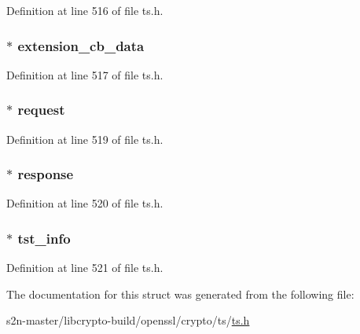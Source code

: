 Definition at line 516 of file ts.\+h.

\subsubsection[{\texorpdfstring{extension\+\_\+cb\+\_\+data}{extension_cb_data}}]{ $\ast$ extension\+\_\+cb\+\_\+data}\hypertarget{struct_t_s__resp__ctx_afc2776f230b919cdbe0ed5a44b3c2958}{}\label{struct_t_s__resp__ctx_afc2776f230b919cdbe0ed5a44b3c2958}


Definition at line 517 of file ts.\+h.

\subsubsection[{\texorpdfstring{request}{request}}]{ $\ast$ request}\hypertarget{struct_t_s__resp__ctx_aa57e1ef1a454401b93515475ff275610}{}\label{struct_t_s__resp__ctx_aa57e1ef1a454401b93515475ff275610}


Definition at line 519 of file ts.\+h.

\subsubsection[{\texorpdfstring{response}{response}}]{ $\ast$ response}\hypertarget{struct_t_s__resp__ctx_ad968637a298a0bdcc766347bb2bd5a1c}{}\label{struct_t_s__resp__ctx_ad968637a298a0bdcc766347bb2bd5a1c}


Definition at line 520 of file ts.\+h.

\subsubsection[{\texorpdfstring{tst\+\_\+info}{tst_info}}]{ $\ast$ tst\+\_\+info}\hypertarget{struct_t_s__resp__ctx_aaca0fcdfa8c33f023dab39596693bef0}{}\label{struct_t_s__resp__ctx_aaca0fcdfa8c33f023dab39596693bef0}


Definition at line 521 of file ts.\+h.



The documentation for this struct was generated from the following file\+:\begin{DoxyCompactItemize}
\item 
s2n-\/master/libcrypto-\/build/openssl/crypto/ts/\hyperlink{crypto_2ts_2ts_8h}{ts.\+h}\end{DoxyCompactItemize}
